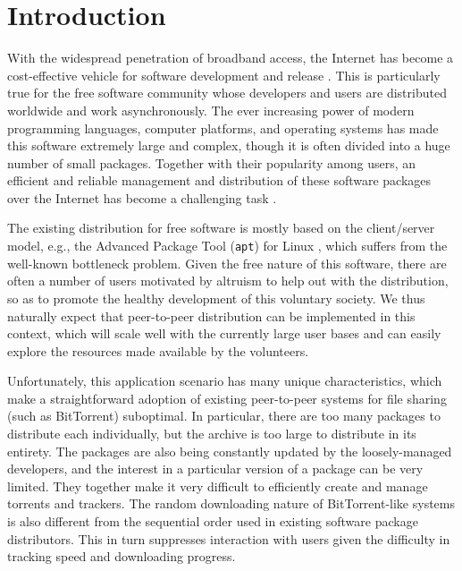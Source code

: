 \documentclass[conference]{IEEEtran}
\begin{document}

\section{Introduction}
\label{intro}

With the widespread penetration of broadband access, the Internet has become a cost-effective
vehicle for software development and release \cite{feller2000fao}. This is particularly true for the free software
community whose developers and users are distributed worldwide and work asynchronously. The ever increasing power of
modern programming languages, computer platforms, and operating systems has made this software extremely large and complex,
though it is often divided into a huge number of small packages.
Together with their popularity among users,
an efficient and reliable management and distribution of these software packages over the Internet has become a challenging task \cite{ubuntu-blueprint}.

The existing distribution for free software is mostly based on the client/server model, e.g.,
the Advanced Package Tool (\texttt{apt}) for Linux \cite{apt}, which suffers from the well-known bottleneck problem.
Given the free nature of this software, there are often a number of users
motivated by altruism to help out with the distribution, so as to promote the healthy development
of this voluntary society.
We thus naturally expect that peer-to-peer distribution can be implemented in
this context, which will scale well with the currently large user bases and can easily explore the resources made available by
the volunteers.

Unfortunately, this application scenario has many unique characteristics, which
make a straightforward adoption of existing peer-to-peer systems for file sharing (such as BitTorrent) suboptimal. In particular,
there are too many packages to distribute each individually, but the archive is
too large to distribute in its entirety. The packages are also being constantly
updated by the loosely-managed developers, and the interest in a particular version of a package can be very
limited. They together make it very difficult to efficiently create and manage torrents and trackers. The random downloading nature of BitTorrent-like systems is also different from the
sequential order used in existing software package distributors. This in turn suppresses interaction with users
given the difficulty in tracking speed and downloading progress.
\end{document}
